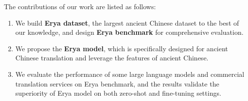 The contributions of our work are listed as follows:  
\begin{enumerate}
\item We build \textbf{Erya dataset}, the largest ancient Chinese dataset to the best of our knowledge, and design \textbf{Erya benchmark} for comprehensive evaluation.
\item We propose the \textbf{Erya model}, which is specifically designed for ancient Chinese translation and leverage the features of ancient Chinese.
\item We evaluate the performance of some large language models and commercial translation services on Erya benchmark, and the results validate the superiority of Erya model on both zero-shot and fine-tuning settings.
\end{enumerate}










